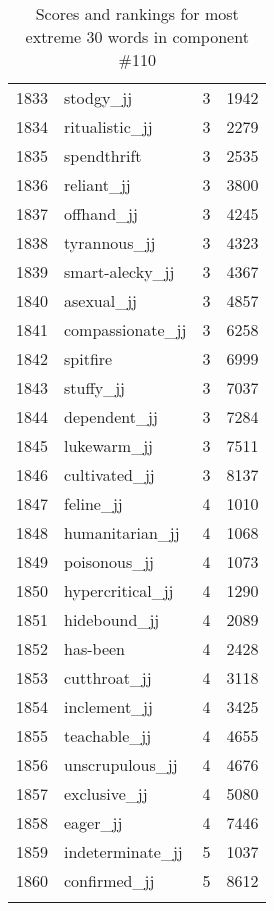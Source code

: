\begin{longtable}[!htbp]{| rlr@{.}l |}
    1833 & stodgy\_jj & 3 & 1942 \\
    1834 & ritualistic\_jj & 3 & 2279 \\
    1835 & spendthrift & 3 & 2535 \\
    1836 & reliant\_jj & 3 & 3800 \\
    1837 & offhand\_jj & 3 & 4245 \\
    1838 & tyrannous\_jj & 3 & 4323 \\
    1839 & smart-alecky\_jj & 3 & 4367 \\
    1840 & asexual\_jj & 3 & 4857 \\
    1841 & compassionate\_jj & 3 & 6258 \\
    1842 & spitfire & 3 & 6999 \\
    1843 & stuffy\_jj & 3 & 7037 \\
    1844 & dependent\_jj & 3 & 7284 \\
    1845 & lukewarm\_jj & 3 & 7511 \\
    1846 & cultivated\_jj & 3 & 8137 \\
    1847 & feline\_jj & 4 & 1010 \\
    1848 & humanitarian\_jj & 4 & 1068 \\
    1849 & poisonous\_jj & 4 & 1073 \\
    1850 & hypercritical\_jj & 4 & 1290 \\
    1851 & hidebound\_jj & 4 & 2089 \\
    1852 & has-been & 4 & 2428 \\
    1853 & cutthroat\_jj & 4 & 3118 \\
    1854 & inclement\_jj & 4 & 3425 \\
    1855 & teachable\_jj & 4 & 4655 \\
    1856 & unscrupulous\_jj & 4 & 4676 \\
    1857 & exclusive\_jj & 4 & 5080 \\
    1858 & eager\_jj & 4 & 7446 \\
    1859 & indeterminate\_jj & 5 & 1037 \\
    1860 & confirmed\_jj & 5 & 8612 \\
    \hline
    \caption{Scores and rankings for most extreme 30 words in component \#110} \\
\end{longtable}
